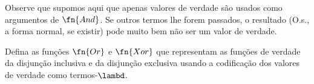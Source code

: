 \documentclass[../../../include/open-logic-section]{subfiles}
\begin{document}
Observe que supomos aqui que apenas valores de verdade são usados como argumentos
de $\fn{And}$. Se outros termos lhe forem passados, o resultado (O.s.\@, a
forma normal, se existir) pode muito bem não ser um valor de verdade.

\begin{prob}
  Defina as funções $\fn{Or}$ e $\fn{Xor}$ que representam as funções de verdade
  da disjunção inclusiva e da disjunção exclusiva usando a codificação
  dos valores de verdade como termos-$\lambd$.
\end{prob}
\end{document}
